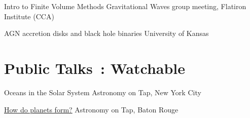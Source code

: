 \documentclass[10pt]{article} %
\begin{document}
\begin{paracol}{1}



	
	{Intro to Finite Volume Methods}
	{Gravitational Waves group meeting, Flatiron Institute (CCA)}
	
	{AGN accretion disks and black hole binaries}
	{University of Kansas}

\section{Public Talks \footnotesize {\faVideoCamera}\,: Watchable \phantom{XX.}}





	
	{Oceans in the Solar System}
	{Astronomy on Tap, New York City}
	
	{\href{https://www.youtube.com/watch?v=E-OefNM564E}{How do planets form?} \faVideoCamera}
	{Astronomy on Tap, Baton Rouge}






\end{paracol}
\end{document}
